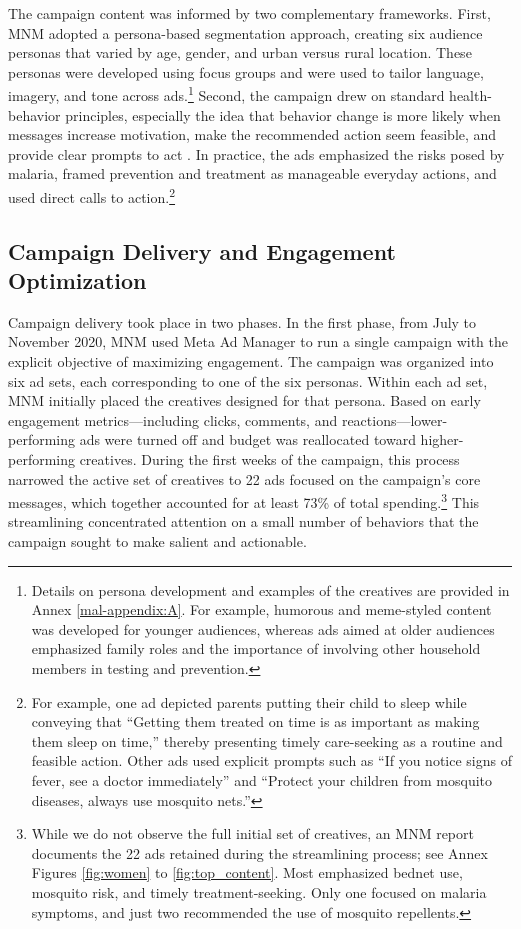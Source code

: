 The campaign content was informed by two complementary frameworks. First, MNM adopted a persona-based segmentation approach, creating six audience personas that varied by age, gender, and urban versus rural location. These personas were developed using focus groups and were used to tailor language, imagery, and tone across ads.\footnote{Details on persona development and examples of the creatives are provided in Annex \ref{mal-appendix:A}. For example, humorous and meme-styled content was developed for younger audiences, whereas ads aimed at older audiences emphasized family roles and the importance of involving other household members in testing and prevention.} Second, the campaign drew on standard health-behavior principles, especially the idea that behavior change is more likely when messages increase motivation, make the recommended action seem feasible, and provide clear prompts to act \citep{fogg2009behavior}. In practice, the ads emphasized the risks posed by malaria, framed prevention and treatment as manageable everyday actions, and used direct calls to action.\footnote{For example, one ad depicted parents putting their child to sleep while conveying that ``Getting them treated on time is as important as making them sleep on time,'' thereby presenting timely care-seeking as a routine and feasible action. Other ads used explicit prompts such as ``If you notice signs of fever, see a doctor immediately'' and ``Protect your children from mosquito diseases, always use mosquito nets.''}

\subsection{Campaign Delivery and Engagement Optimization}


Campaign delivery took place in two phases. In the first phase, from July to November 2020, MNM used Meta Ad Manager to run a single campaign with the explicit objective of maximizing engagement. The campaign was organized into six ad sets, each corresponding to one of the six personas. Within each ad set, MNM initially placed the creatives designed for that persona. Based on early engagement metrics---including clicks, comments, and reactions---lower-performing ads were turned off and budget was reallocated toward higher-performing creatives. During the first weeks of the campaign, this process narrowed the active set of creatives to 22 ads focused on the campaign’s core messages, which together accounted for at least 73\% of total spending.\footnote{While we do not observe the full initial set of creatives, an MNM report documents the 22 ads retained during the streamlining process; see Annex Figures \ref{fig:women} to \ref{fig:top_content}. Most emphasized bednet use, mosquito risk, and timely treatment-seeking. Only one focused on malaria symptoms, and just two recommended the use of mosquito repellents.} This streamlining concentrated attention on a small number of behaviors that the campaign sought to make salient and actionable.

